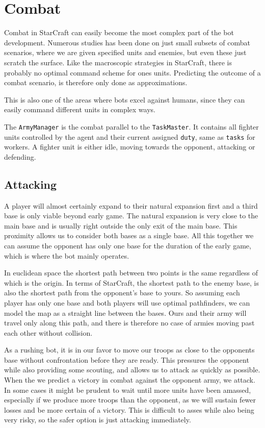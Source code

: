 \chapter{Combat}
\label{ch:combat}
Combat in StarCraft can easily become the most complex part of the bot development. Numerous studies has been done on just small subsets of combat scenarios, where we are given specified units and enemies, but even these just scratch the surface. Like the macroscopic strategies in StarCraft, there is probably no optimal command scheme for ones units. Predicting the outcome of a combat scenario, is therefore only done as approximations.

This is also one of the areas where bots excel against humans, since they can easily command different units in complex ways.

The \texttt{ArmyManager} is the combat parallel to the \texttt{TaskMaster}. It contains all fighter units controlled by the agent and their current assigned \texttt{duty}, same as \texttt{tasks} for workers. A fighter unit is either idle, moving towards the opponent, attacking or defending.

\section{Attacking}
A player will almost certainly expand to their natural expansion first and a third base is only viable beyond early game. The natural expansion is very close to the main base and is usually right outside the only exit of the main base. This proximity allows us to consider both bases as a single base. All this together we can assume the opponent has only one base for the duration of the early game, which is where the bot mainly operates.

In euclidean space the shortest path between two points is the same regardless of which is the origin. In terms of StarCraft, the shortest path to the enemy base, is also the shortest path from the opponent's base to yours. So assuming each player has only one base and both players will use optimal pathfinders, we can model the map as a straight line between the bases. Ours and their army will travel only along this path, and there is therefore no case of armies moving past each other without collision.

As a rushing bot, it is in our favor to move our troops as close to the opponents base without confrontation before they are ready. This pressures the opponent while also providing some scouting, and allows us to attack as quickly as possible. When the we predict a victory in combat against the opponent army, we attack. In some cases it might be prudent to wait until more units have been amassed, especially if we produce more troops than the opponent, as we will sustain fewer losses and be more certain of a victory. This is difficult to asses while also being very risky, so the safer option is just attacking immediately.

